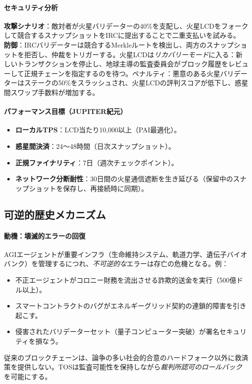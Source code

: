 \documentclass[11pt]{article}
\begin{document}
\paragraph{セキュリティ分析}
\textbf{攻撃シナリオ}：敵対者が火星バリデーターの40\%を支配し、火星LCDをフォークして競合するスナップショットをIRCに提出することで二重支払いを試みる。\\
\textbf{防御}：IRCバリデーターは競合するMerkleルートを検出し、両方のスナップショットを拒否し、仲裁をトリガーする。火星LCDは\emph{リカバリーモード}に入る：新しいトランザクションを停止し、地球主導の監査委員会がブロック履歴をレビューして正規チェーンを指定するのを待つ。ペナルティ：悪意のある火星バリデーターはステークの50\%をスラッシュされ、火星LCDの評判スコアが低下し、惑星間スワップ手数料が増加する。

\paragraph{パフォーマンス目標（JUPITER紀元）}
\begin{itemize}[noitemsep]
  \item \textbf{ローカルTPS}：LCD当たり10,000以上（PAI最適化）。
  \item \textbf{惑星間決済}：24〜48時間（日次スナップショット）。
  \item \textbf{正規ファイナリティ}：7日（週次チェックポイント）。
  \item \textbf{ネットワーク分断耐性}：30日間の火星通信遮断を生き延びる（保留中のスナップショットを保存し、再接続時に同期）。
\end{itemize}

\subsection{可逆的歴史メカニズム}

\paragraph{動機：壊滅的エラーの回復}
AGIエージェントが重要インフラ（生命維持システム、軌道力学、遺伝子バイオバンク）を管理するにつれ、\emph{不可逆的な}エラーは存亡の危機となる。例：
\begin{itemize}[noitemsep]
  \item 不正エージェントがコロニー財務を流出させる詐欺的送金を実行（500億ドル以上）。
  \item スマートコントラクトのバグがエネルギーグリッド契約の連鎖的障害を引き起こす。
  \item 侵害されたバリデーターセット（量子コンピューター突破）が署名セキュリティを損なう。
\end{itemize}
従来のブロックチェーンは、論争の多い社会的合意のハードフォーク以外に救済策を提供しない。TOSは監査可能性を保持しながら\emph{裁判所認可のロールバック}を可能にする。
\end{document}
